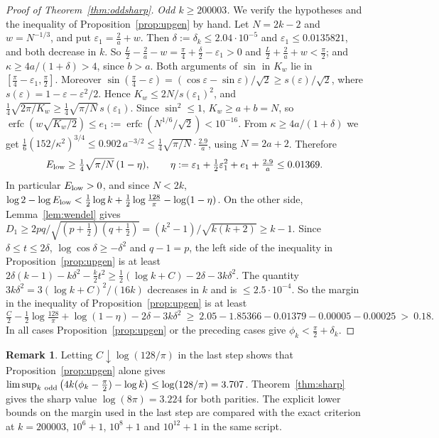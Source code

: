 \documentclass[11pt]{amsart}
\theoremstyle{definition}
\newtheorem{remark}[theorem]{Remark}
\begin{document}
\begin{proof}[Proof of Theorem~\ref{thm:oddsharp}]
\emph{Odd $k\ge200003$.} We verify the hypotheses and the inequality of Proposition~\ref{prop:upgen} by hand. Let $N=2k-2$ and $w=N^{-1/3}$, and
put $\varepsilon_1=\frac2a+w$. Then $\delta:=\delta_k\le2.04\cdot10^{-5}$ and $\varepsilon_1\le0.0135821$, and both decrease in $k$. So
$\frac L2-\frac2a-w=\frac\pi4+\frac\delta2-\varepsilon_1>0$ and $\frac L2+\frac2a+w<\frac\pi2$; and $\kappa\ge4a/(1+\delta)>4$, since $b>a$.
Both arguments of $\sin$ in $K_w$ lie in $[\frac\pi4-\varepsilon_1,\frac\pi2]$. Moreover
$\sin(\frac\pi4-\varepsilon)=(\cos\varepsilon-\sin\varepsilon)/\sqrt2\ge s(\varepsilon)/\sqrt2$, where $s(\varepsilon)=1-\varepsilon-\varepsilon^2/2$. Hence
$K_w\le2N/s(\varepsilon_1)^2$, and $\frac14\sqrt{2\pi/K_w}\ge\frac14\sqrt{\pi/N}\,s(\varepsilon_1)$.
Since $\sin^2\le1$, $K_w\ge a+b=N$, so $\operatorname{erfc}(w\sqrt{K_w/2})\le e_1:=\operatorname{erfc}(N^{1/6}/\sqrt2)<10^{-16}$.
From $\kappa\ge4a/(1+\delta)$ we get $\frac16(152/\kappa^2)^{3/4}\le0.902\,a^{-3/2}\le\frac14\sqrt{\pi/N}\cdot\frac{2.9}a$, using $N=2a+2$. Therefore
\[
E_{\rm low}\ge\tfrac14\sqrt{\pi/N}\,(1-\eta),\qquad \eta:=\varepsilon_1+\tfrac12\varepsilon_1^2+e_1+\tfrac{2.9}a\le0.01369 .
\]
In particular $E_{\rm low}>0$, and since $N<2k$,
$\log2-\log E_{\rm low}<\frac12\log k+\frac12\log\frac{128}\pi-\log(1-\eta)$.
On the other side, Lemma~\ref{lem:wendel} gives $D_1\ge2pq/\sqrt{(p+\frac12)(q+\frac12)}=(k^2-1)/\sqrt{k(k+2)}\ge k-1$. Since $\delta\le t\le2\delta$,
$\log\cos\delta\ge-\delta^2$ and $q-1=p$, the left side of the inequality in Proposition~\ref{prop:upgen} is at least
$2\delta(k-1)-k\delta^2-\frac k2t^2\ge\frac12(\log k+C)-2\delta-3k\delta^2$. The quantity $3k\delta^2=3(\log k+C)^2/(16k)$ decreases in $k$ and is
$\le2.5\cdot10^{-4}$. So the margin in the inequality of Proposition~\ref{prop:upgen} is at least
\[
\tfrac C2-\tfrac12\log\tfrac{128}\pi+\log(1-\eta)-2\delta-3k\delta^2\ \ge\ 2.05-1.85366-0.01379-0.00005-0.00025\ >\ 0.18 .
\]
In all cases Proposition~\ref{prop:upgen} or the preceding cases give $\phi_k<\frac\pi2+\delta_k$.
\end{proof}

\begin{remark}
Letting $C\downarrow\log(128/\pi)$ in the last step shows that Proposition~\ref{prop:upgen} alone gives
$\limsup_{k\ \rm odd}\big(4k(\phi_k-\frac\pi2)-\log k\big)\le\log(128/\pi)=3.707$. Theorem~\ref{thm:sharp} gives the sharp value $\log(8\pi)=3.224$
for both parities. The explicit lower bounds on the margin used in the last step are compared with the exact criterion at
$k=200003$, $10^6+1$, $10^8+1$ and $10^{12}+1$ in the same script.
\end{remark}
\end{document}
